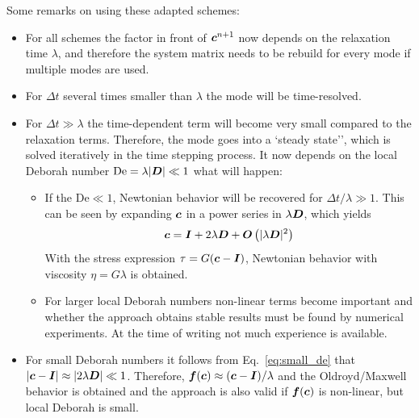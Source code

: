 Some remarks on using these adapted schemes:
\begin{itemize}
   \item For all schemes the factor in front of $\boldsymbol{c}^{n+1}$ 
         now depends on the relaxation time $\lambda$, and therefore the 
         system matrix needs to be rebuild for every mode if multiple 
         modes are used.
   \item For $\Delta t$ several times smaller than $\lambda$ the mode will be
         time-resolved. 
   \item For $\Delta t\gg\lambda$ the time-dependent term will 
         become very small compared to the relaxation terms. Therefore, the
         mode goes into a `steady state'', which is solved iteratively
         in the time stepping process. It now depends on the local Deborah
         number $\text{De}=\lambda |\boldsymbol{D}| \ll 1$ what will happen:
         \begin{itemize}
            
   \item If the $\text{De}\ll 1$, Newtonian    
         behavior will be recovered for $\Delta t/\lambda \gg 1$.
         This can be seen by expanding $\boldsymbol{c}$ in 
         a power series in $\lambda \boldsymbol{D}$, which yields
         \begin{equation}
           \boldsymbol{c} = \boldsymbol{I} + 2 \lambda \boldsymbol{D} +  
          \boldsymbol{O}\left( |\lambda \boldsymbol{D}|^2 \right) \label{eq:small_de}
         \end{equation}
         With the stress expression $\tau=G(\boldsymbol{c}-\boldsymbol{I})$, Newtonian
         behavior with viscosity $\eta=G\lambda$ is obtained.
   \item For larger local Deborah numbers non-linear terms become important and
         whether the approach obtains stable results must be found by numerical
         experiments. At the time of writing not much experience is available.
         \end{itemize}

   \item For small Deborah numbers it follows from Eq.~\eqref{eq:small_de} that
         $|\boldsymbol{c} - \boldsymbol{I}| \approx |2\lambda \boldsymbol{D}| \ll 1$. Therefore, 
         $\boldsymbol{f}(\boldsymbol{c})\approx(\boldsymbol{c}-\boldsymbol{I})/\lambda$ and the Oldroyd/Maxwell
         behavior is obtained 
         and the approach is also valid if $\boldsymbol{f}(\boldsymbol{c})$ is non-linear, but
         local Deborah is small.

\end{itemize}

